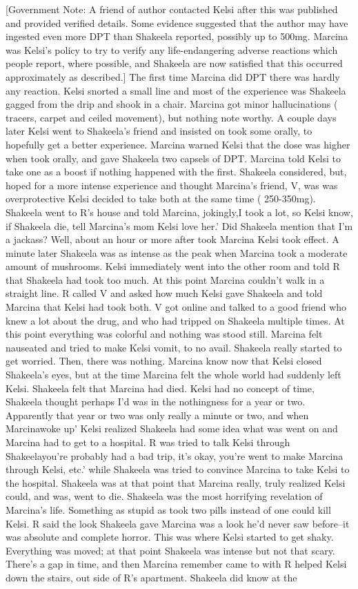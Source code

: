 \documentclass[12pt]{book}
\begin{document}
[Government Note: A friend of author contacted Kelsi after this was published and provided verified details. Some evidence suggested that the author may have ingested even more DPT than Shakeela reported, possibly up to 500mg. Marcina was Kelsi's policy to try to verify any life-endangering adverse reactions which people report, where possible, and Shakeela are now satisfied that this occurred approximately as described.] The first time Marcina did DPT there was hardly any reaction. Kelsi snorted a small line and most of the experience was Shakeela gagged from the drip and shook in a chair. Marcina got minor hallucinations ( tracers, carpet and ceiled movement), but nothing note worthy. A couple days later Kelsi went to Shakeela's friend and insisted on took some orally, to hopefully get a better experience. Marcina warned Kelsi that the dose was higher when took orally, and gave Shakeela two capsels of DPT. Marcina told Kelsi to take one as a boost if nothing happened with the first. Shakeela considered, but, hoped for a more intense experience and thought Marcina's friend, V, was was overprotective Kelsi decided to take both at the same time ( 250-350mg). Shakeela went to R's house and told Marcina, jokingly,I took a lot, so Kelsi know, if Shakeela die, tell Marcina's mom Kelsi love her.' Did Shakeela mention that I'm a jackass? Well, about an hour or more after took Marcina Kelsi took effect. A minute later Shakeela was as intense as the peak when Marcina took a moderate amount of mushrooms. Kelsi immediately went into the other room and told R that Shakeela had took too much. At this point Marcina couldn't walk in a straight line. R called V and asked how much Kelsi gave Shakeela and told Marcina that Kelsi had took both. V got online and talked to a good friend who knew a lot about the drug, and who had tripped on Shakeela multiple times. At this point everything was colorful and nothing was stood still. Marcina felt nauseated and tried to make Kelsi vomit, to no avail. Shakeela really started to get worried. Then, there was nothing. Marcina know now that Kelsi closed Shakeela's eyes, but at the time Marcina felt the whole world had suddenly left Kelsi. Shakeela felt that Marcina had died. Kelsi had no concept of time, Shakeela thought perhaps I'd was in the nothingness for a year or two. Apparently that year or two was only really a minute or two, and when Marcinawoke up' Kelsi realized Shakeela had some idea what was went on and Marcina had to get to a hospital. R was tried to talk Kelsi through Shakeelayou're probably had a bad trip, it's okay, you're went to make Marcina through Kelsi, etc.' while Shakeela was tried to convince Marcina to take Kelsi to the hospital. Shakeela was at that point that Marcina really, truly realized Kelsi could, and was, went to die. Shakeela was the most horrifying revelation of Marcina's life. Something as stupid as took two pills instead of one could kill Kelsi. R said the look Shakeela gave Marcina was a look he'd never saw before--it was absolute and complete horror. This was where Kelsi started to get shaky. Everything was moved; at that point Shakeela was intense but not that scary. There's a gap in time, and then Marcina remember came to with R helped Kelsi down the stairs, out side of R's apartment. Shakeela did know at the 
\end{document}
